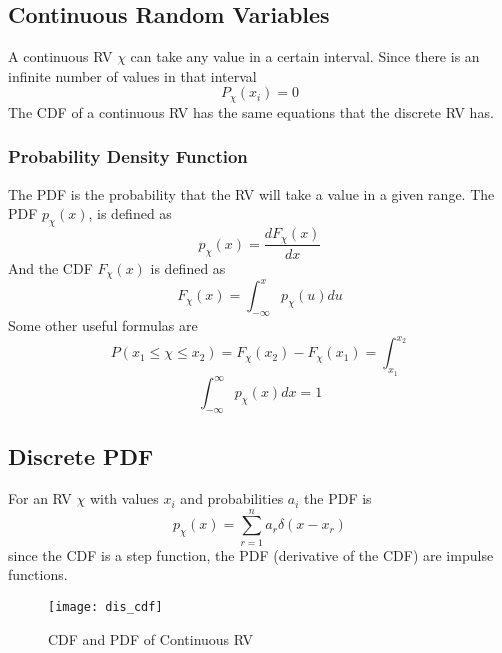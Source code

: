 \documentclass{article}
\begin{document}
    \subsection{Continuous Random Variables}
    A continuous RV $\chi$ can take any value in a certain interval. Since there is an infinite number of values in that interval
    \begin{equation}
        P_{\chi}(x_i) = 0
    \end{equation}
    The CDF of a continuous RV has the same equations that the discrete RV has.

    \subsubsection{Probability Density Function}
    The PDF is the probability that the RV will take a value in a given range. The PDF $p_{\chi}(x)$, is defined as
    \begin{equation}
        p_{\chi}(x) = \frac{dF_{\chi}(x)}{dx}
    \end{equation}
    And the CDF $F_{\chi}(x)$ is defined as  
    \begin{equation}
        F_{\chi}(x) = \int_{-\infty}^{x} p_{\chi}(u)du
    \end{equation}
    Some other useful formulas are
    \begin{equation}
        P(x_1 \le \chi \le x_2) = F_{\chi}(x_2) - F_{\chi}(x_1) = \int_{x_1}^{x_2}
    \end{equation}
    \begin{equation}
        \int_{-\infty}^{\infty}p_{\chi}(x)dx = 1
    \end{equation}
    
    \subsection{Discrete PDF}
    For an RV $\chi$ with values $x_i$ and probabilities $a_i$ the PDF is
    \begin{equation}
        p_{\chi}(x) = \sum_{r=1}^{n}a_r \delta(x-x_r)
    \end{equation}
    since the CDF is a step function, the PDF (derivative of the CDF) are impulse functions.

    \begin{figure}[h]
        \centering
        \texttt{[image: dis\_cdf]}
        \caption{CDF and PDF of Continuous RV}
    \end{figure}
\end{document}
